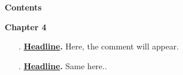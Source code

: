 \Huge{\bfseries Contents }
\vspace{10mm}

\vspace{0.5mm}
\Large{\textbf{Chapter 4}}
\normalsize
\begin{enumerate}[leftmargin=4em]
	\item[\pageref{fil.1}.] \textbf{\hyperref[fil.1]{Headline}.} Here, the comment will appear.
	\item[\pageref{fil2.1}.] \textbf{\hyperref[fil2.1]{Headline}.} Same here..
\end{enumerate}

